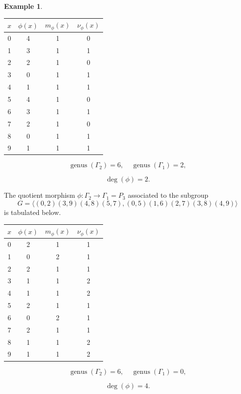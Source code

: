 \documentclass[12pt,letterpaper]{article}
\theoremstyle{definition}
\newtheorem{example}[theorem]{Example}
\DeclareMathOperator{\genus}{genus}
\begin{document}
\begin{example}
{\begin{center}
\begin{tabular}{c|c|c|c}  
  $x$ & $\phi(x)$ & $m_\phi(x)$ & $\nu_\phi(x)$ \\ \hline
  0   &    4   &        1         &  0   \\ 
  1   &    3   &        1         &  1   \\ 
  2   &    2   &        1         &  0   \\ 
  3   &    0   &        1         &  1   \\ 
  4   &    1   &        1         &  1   \\ 
  5   &    4   &        1         &  0    \\ 
  6   &    3   &        1         &  1   \\ 
  7   &    2   &        1         &  0   \\
  8   &    0   &        1         &  1   \\
  9   &    1   &        1         &  1   \\ 
\end{tabular}
\end{center}

\[
  \genus(\Gamma_2) =6,\ \ \ \ \
  \genus(\Gamma_1) =2,
\]

\[
\deg(\phi) =2.
\]

The quotient morphism $\phi:\Gamma_2\to \Gamma_1=P_3$
associated to the subgroup
\[
G = \langle (0,2)(3,9)(4,8)(5,7), (0,5)(1,6)(2,7)(3,8)(4,9) \rangle
\]
is tabulated below.

\begin{center}
\begin{tabular}{c|c|c|c}  
  $x$ & $\phi(x)$ & $m_\phi(x)$ & $\nu_\phi(x)$ \\ \hline
  0   &    2   &        1         &  1   \\ 
  1   &    0   &        2         &  1   \\ 
  2   &    2   &        1         &  1   \\ 
  3   &    1   &        1         &  2   \\ 
  4   &    1   &        1         &  2   \\ 
  5   &    2   &        1         &  1    \\ 
  6   &    0   &        2         &  1   \\ 
  7   &    2   &        1         &  1   \\
  8   &    1   &        1         &  2   \\
  9   &    1   &        1         &  2   \\ 
\end{tabular}
\end{center}

\[
  \genus(\Gamma_2) =6,\ \ \ \ \
  \genus(\Gamma_1) =0,
\]

\[
\deg(\phi) =4.
\]

}
\end{example}
\end{document}
